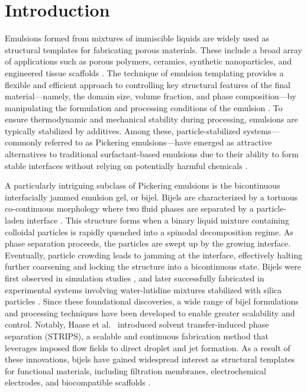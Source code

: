\section{Introduction}

Emulsions formed from mixtures of immiscible liquids are widely used as structural 
templates for fabricating porous materials. These include a broad array of applications 
such as porous polymers, ceramics, synthetic nanoparticles, and engineered tissue scaffolds 
\cite{zhang_emulsion_2019, stubenrauch_emulsion_2018, jones_high-temperature_2009, binks_macroporous_2002, 
abbadian_chaleshtari_nanoemulsion_2022, aldemir_dikici_basic_2020}. The technique of emulsion templating 
provides a flexible and efficient approach to controlling key structural features of the final
material—namely, the domain size, volume fraction, and phase composition—by manipulating the 
formulation and processing conditions of the emulsion \cite{mudassir_fundamentals_2021}. To ensure 
thermodynamic and mechanical stability during processing, emulsions are typically stabilized by additives. 
Among these, particle-stabilized systems—commonly referred to as Pickering emulsions—have emerged as attractive 
alternatives to traditional surfactant-based emulsions due to their ability to form stable interfaces without 
relying on potentially harmful chemicals \cite{ramsden_separation_1903, zheng_pickering_2022, menner_particle-stabilized_2007}.

A particularly intriguing subclass of Pickering emulsions is the bicontinuous interfacially jammed emulsion gel, or bijel. 
Bijels are characterized by a tortuous co-continuous morphology where two fluid phases are separated by a particle-laden 
interface \cite{cates_bijels_2008}. This structure forms when a binary liquid mixture containing colloidal particles is 
rapidly quenched into a spinodal decomposition regime. As phase separation proceeds, the particles are swept up by the 
growing interface. Eventually, particle crowding leads to jamming at the interface, effectively halting further coarsening 
and locking the structure into a bicontinuous state. Bijels were first observed in simulation studies \cite{stratford_colloidal_2005}, 
and later successfully fabricated in experimental systems involving water-lutidine mixtures stabilized with silica particles 
\cite{clegg_emulsification_2007, herzig_bicontinuous_2007}. Since these foundational discoveries, a wide range of bijel 
formulations and processing techniques have been developed to enable greater scalability and control. Notably, 
Haase et al.~\cite{haase_continuous_2015} introduced solvent transfer-induced phase separation (STRIPS), a scalable 
and continuous fabrication method that leverages imposed flow fields to direct droplet and jet formation. As a result 
of these innovations, bijels have gained widespread interest as structural templates for functional materials, including 
filtration membranes, electrochemical electrodes, and biocompatible scaffolds \cite{yabuno_preparation_2020, pang_highly_2020, 
witt_microstructural_2016, thorson_composite_2018}.

